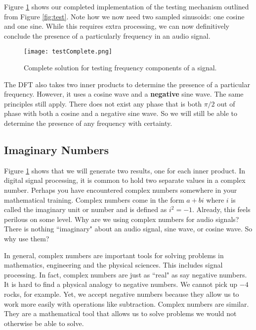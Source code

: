 Figure \ref{fig:testComplete} shows our completed implementation 
of the testing mechanism outlined from
Figure \ref{fig:test}.  Note how we now need two sampled sinusoids: one cosine and one sine.  While this
requires extra processing, we can now definitively conclude the presence of a particularly frequency in an 
audio signal.

\begin{figure}[h]
	\caption{Complete solution for testing frequency components of a signal.}
	\centering
	\texttt{[image: testComplete.png]}
	\label{fig:testComplete}
\end{figure}

The DFT also takes two inner products to determine the presence of a particular frequency.  However, it uses
a cosine wave and a \textbf{negative} sine wave.  The same principles still apply.  There does not exist any
phase that is both $\pi/2$ out of phase with both a cosine and a negative sine wave.  So we will still be able 
to determine the presence of any frequency with certainty.


\subsection*{Imaginary Numbers}

Figure \ref{fig:testComplete} shows that we will generate two results, one for
each inner product.  In digital signal processing, it is common to hold two separate values in a complex number.  
Perhaps you have encountered complex numbers somewhere in your mathematical training.  Complex numbers
come in the form $a + bi$ where $i$ is called the imaginary unit or number and is defined as $i^2 = -1$.  Already,
this feels perilous on some level.  Why are we using complex numbers for audio signals?  There is nothing
``imaginary" about an audio signal, sine wave, or cosine wave.  So why use them?

In general, complex numbers are important  tools for solving problems in mathematics, engineering and
the physical sciences.  This includes signal processing.  In fact, complex numbers are just as 
``real" as say negative numbers.
It is hard to find a physical analogy to negative numbers.  We cannot pick up $-4$ rocks, for example.  Yet, we 
accept negative numbers because they allow us to work more easily with operations like subtraction.  Complex
numbers are similar.  They are a mathematical tool that allows us to solve problems we would not otherwise be
able to solve.   

